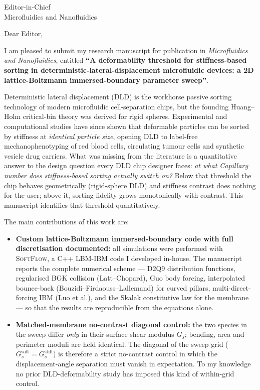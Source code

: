 \documentclass[11pt]{letter}
\begin{document}
\begin{letter}{
Editor-in-Chief\\
Microfluidics and Nanofluidics
}

\opening{Dear Editor,}

I am pleased to submit my research manuscript for publication in
\textit{Microfluidics and Nanofluidics}, entitled
\textbf{``A deformability threshold for stiffness-based sorting in
deterministic-lateral-displacement microfluidic devices: a 2D
lattice-Boltzmann immersed-boundary parameter sweep''}.

Deterministic lateral displacement (DLD) is the workhorse passive
sorting technology of modern microfluidic cell-separation chips,
but the founding Huang--Holm critical-bin theory was derived for
rigid spheres. Experimental and computational studies have since
shown that deformable particles can be sorted by stiffness at
\emph{identical particle size}, opening DLD to label-free
mechanophenotyping of red blood cells, circulating tumour cells
and synthetic vesicle drug carriers. What was missing from the
literature is a quantitative answer to the design question every
DLD chip designer faces: \emph{at what Capillary number does
stiffness-based sorting actually switch on?} Below that threshold
the chip behaves geometrically (rigid-sphere DLD) and stiffness
contrast does nothing for the user; above it, sorting fidelity
grows monotonically with contrast. This manuscript identifies that
threshold quantitatively.

The main contributions of this work are:
\begin{itemize}
  \item \textbf{Custom lattice-Boltzmann immersed-boundary code with
        full discretisation documented:} all simulations were
        performed with \textsc{SoftFlow}, a C++ LBM-IBM code I
        developed in-house. The manuscript reports the complete
        numerical scheme --- D2Q9 distribution functions, regularised
        BGK collision (Latt--Chopard), Guo body forcing, interpolated
        bounce-back (Bouzidi--Firdaouss--Lallemand) for curved
        pillars, multi-direct-forcing IBM (Luo et al.), and the
        Skalak constitutive law for the membrane --- so that the
        results are reproducible from the equations alone.

  \item \textbf{Matched-membrane no-contrast diagonal control:} the
        two species in the sweep differ \emph{only} in their surface
        shear modulus $G_s$; bending, area and perimeter moduli are
        held identical. The diagonal of the sweep grid
        ($G_s^{\text{soft}} = G_s^{\text{stiff}}$) is therefore a
        strict no-contrast control in which the displacement-angle
        separation must vanish in expectation. To my knowledge no
        prior DLD-deformability study has imposed this kind of
        within-grid control.


\end{itemize}
\end{letter}
\end{document}
